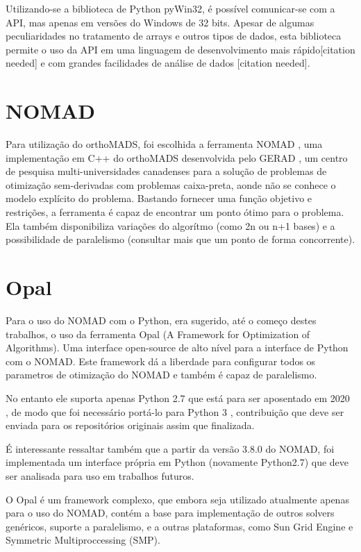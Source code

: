  Utilizando-se a biblioteca de Python pyWin32, é possível comunicar-se com a API, mas apenas em versões do Windows de 32 bits. Apesar de algumas peculiaridades no tratamento de arrays e outros tipos de dados, esta biblioteca permite o uso da API em uma linguagem de desenvolvimento mais rápido[citation needed] e com grandes facilidades de análise de dados [citation needed].

\section{NOMAD}
Para utilização do orthoMADS, foi escolhida a ferramenta NOMAD \cite{Nomad}, uma implementação em C++ do orthoMADS desenvolvida pelo GERAD \cite{gerad}, um centro de pesquisa multi-universidades canadenses  para a solução de problemas de otimização sem-derivadas com problemas caixa-preta, aonde não se conhece o modelo explícito do problema. Bastando fornecer uma função objetivo e restrições, a ferramenta é capaz de encontrar um ponto ótimo para o problema. Ela também disponibiliza variações do algorítmo (como 2n ou n+1 bases) e a possibilidade de paralelismo (consultar mais que um ponto de forma concorrente).  

	

\section{Opal}
Para o uso do NOMAD com o Python, era sugerido, até o começo destes trabalhos, o uso da ferramenta Opal \cite{opal} (A Framework for Optimization of Algorithms). Uma interface open-source de alto nível para a interface de Python com o NOMAD. Este framework dá a liberdade para configurar todos os parametros de otimização do NOMAD e também é capaz de paralelismo.

No entanto ele suporta apenas Python 2.7 que está para ser aposentado em 2020 \cite{python27sched}, de modo que foi necessário portá-lo para Python 3 \cite{opalPython3}, contribuição que deve ser enviada para os repositórios originais assim que finalizada.

É interessante ressaltar também que a partir da versão 3.8.0 do NOMAD, foi implementada um interface própria em Python (novamente Python2.7) que deve ser analisada para uso em trabalhos futuros.

O Opal é um framework complexo, que embora seja utilizado atualmente apenas para o uso do NOMAD, contém a base para implementação de outros solvers genéricos, suporte a paralelismo, e a outras plataformas, como Sun Grid Engine e Symmetric Multiproccessing (SMP).


